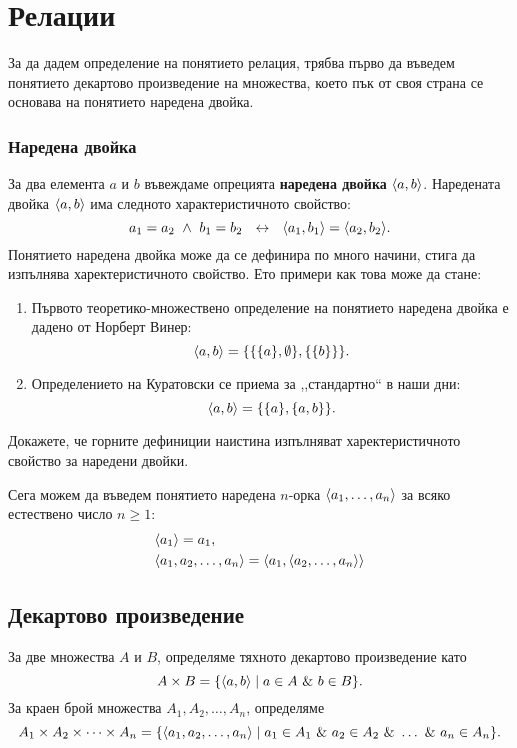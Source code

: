 \chapter{Релации}

За да дадем определение на понятието релация, трябва първо 
да въведем понятието декартово произведение на множества,
което пък от своя страна се основава на понятието наредена двойка.

\subsection*{Наредена двойка}

За два елемента $a$ и $b$ въвеждаме опрецията {\bf наредена двойка} $\langle{a,b}\rangle$.
Наредената двойка $\langle{a,b}\rangle$ има следното характеристичното свойство:
\[a_1 = a_2\ \wedge\ b_1 = b_2\ \iff\ \pair{a_1,b_1} = \pair{a_2,b_2}.\]
Понятието наредена двойка може да се дефинира по много начини, стига да изпълнява харектеристичното свойство.
Ето примери как това може да стане:
\begin{enumerate}[1)]
\item
  Първото теоретико-множествено определение на понятието наредена двойка е
  дадено от Норберт Винер:
  \[\langle{a,b}\rangle = \{\{\{a\},\emptyset\},\{\{b\}\}\}.\]
\item
  Определението на Куратовски се приема за ,,стандартно`` в наши дни:
  \[\langle{a,b}\rangle = \{\{a\},\{a,b\}\}.\]
\end{enumerate}

\begin{problem}
  Докажете, че горните дефиниции наистина изпълняват харектеристичното свойство за наредени двойки.
\end{problem}

\begin{remark}
  Сега можем да въведем понятието наредена $n$-орка $\langle{a_1,\dots,a_n}\rangle$ за всяко естествено число $n \geq 1$:
  \begin{align*}
    & \langle{a_1}\rangle = a_1,\\
    & \langle{a_1,a_2,\dots,a_n}\rangle = \langle{a_1,\langle{a_2,\dots,a_n}\rangle}\rangle
  \end{align*}
\end{remark}
 
\section{Декартово произведение}
За две множества $A$ и $B$, определяме тяхното декартово произведение като
\[A\times B = \{\langle{a,b}\rangle\mid a\in A\ \&\ b\in B\}.\]
За краен брой множества $A_1,A_2,\dots,A_n$, определяме
\[A_1\times A_2\times\cdots\times A_n = \{\pair{a_1,a_2,\dots,a_n}\mid a_1 \in A_1\ \&\ a_2\in A_2\ \&\ \dots\ \&\ a_n \in A_n\}.\]

